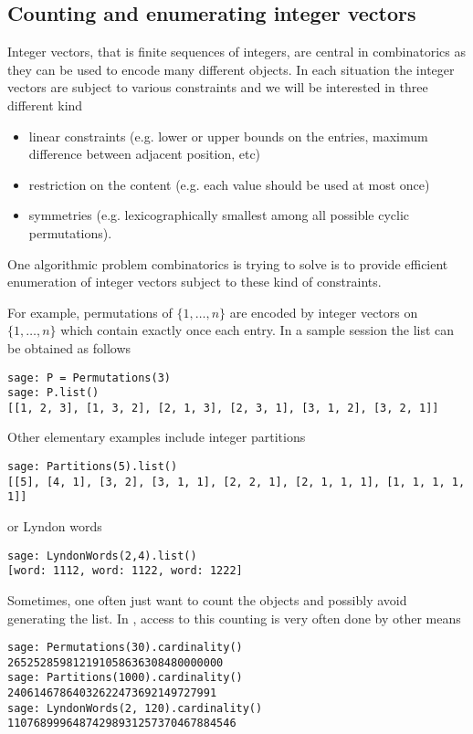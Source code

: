 \documentclass{deliverablereport}
\begin{document}
\subsection{Counting and enumerating integer vectors}
Integer vectors, that is finite sequences of integers, are central
in combinatorics as they can be used to encode many different
objects. In each situation the integer vectors are subject to various
constraints and we will be interested in three different kind
\begin{itemize}
\item linear constraints (e.g. lower or upper bounds on the entries,
maximum difference between adjacent position, etc)
\item restriction on the content (e.g. each value should be used
at most once)
\item symmetries (e.g. lexicographically smallest among all possible
cyclic permutations).
\end{itemize}
One algorithmic problem combinatorics is trying to solve is to provide
efficient enumeration of integer vectors subject to these kind of
constraints.

For example, permutations of $\{1, \ldots, n\}$ are encoded by integer vectors
on $\{1, \ldots, n\}$ which contain exactly once each entry. In a sample
\Sage session the list can be obtained as follows
\begin{verbatim}
sage: P = Permutations(3)
sage: P.list()
[[1, 2, 3], [1, 3, 2], [2, 1, 3], [2, 3, 1], [3, 1, 2], [3, 2, 1]]
\end{verbatim}
Other elementary examples include integer partitions
\begin{verbatim}
sage: Partitions(5).list()
[[5], [4, 1], [3, 2], [3, 1, 1], [2, 2, 1], [2, 1, 1, 1], [1, 1, 1, 1, 1]]
\end{verbatim}
or Lyndon words
\begin{verbatim}
sage: LyndonWords(2,4).list()
[word: 1112, word: 1122, word: 1222]
\end{verbatim}

Sometimes, one often just want to count the objects and possibly avoid
generating the list. In \Sage, access to this counting is very often
done by other means
\begin{verbatim}
sage: Permutations(30).cardinality()
265252859812191058636308480000000
sage: Partitions(1000).cardinality()
24061467864032622473692149727991
sage: LyndonWords(2, 120).cardinality()
11076899964874298931257370467884546
\end{verbatim}
\end{document}
